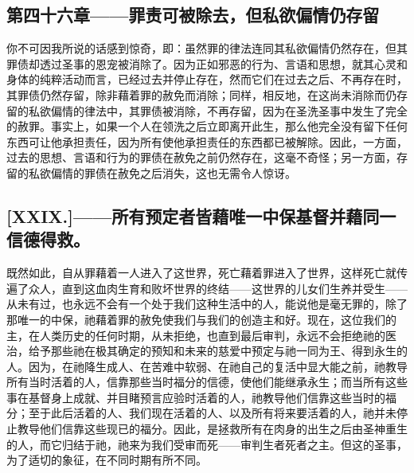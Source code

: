 
\subsection{第四十六章——罪责可被除去，但私欲偏情仍存留}

你不可因我所说的话感到惊奇，即：虽然罪的律法连同其私欲偏情仍然存在，但其罪债却透过圣事的恩宠被消除了。因为正如邪恶的行为、言语和思想，就其心灵和身体的纯粹活动而言，已经过去并停止存在，然而它们在过去之后、不再存在时，其罪债仍然存留，除非藉着罪的赦免而消除；同样，相反地，在这尚未消除而仍存留的私欲偏情的律法中，其罪债被消除，不再存留，因为在圣洗圣事中发生了完全的赦罪。事实上，如果一个人在领洗之后立即离开此生，那么他完全没有留下任何东西可让他承担责任，因为所有使他承担责任的东西都已被解除。因此，一方面，过去的思想、言语和行为的罪债在赦免之前仍然存在，这毫不奇怪；另一方面，存留的私欲偏情的罪债在赦免之后消失，这也无需令人惊讶。\par


\subsection{[XXIX.]——所有预定者皆藉唯一中保基督并藉同一信德得救。}

既然如此，自从罪藉着一人进入了这世界，死亡藉着罪进入了世界，这样死亡就传遍了众人，直到这血肉生育和败坏世界的终结——这世界的儿女们生养并受生——从未有过，也永远不会有一个处于我们这种生活中的人，能说他是毫无罪的，除了那唯一的中保，祂藉着罪的赦免使我们与我们的创造主和好。现在，这位我们的主，在人类历史的任何时期，从未拒绝，也直到最后审判，永远不会拒绝祂的医治，给予那些祂在极其确定的预知和未来的慈爱中预定与祂一同为王、得到永生的人。因为，在祂降生成人、在苦难中软弱、在祂自己的复活中显大能之前，祂教导所有当时活着的人，信靠那些当时福分的信德，使他们能继承永生；而当所有这些事在基督身上成就、并目睹预言应验时活着的人，祂教导他们信靠这些当时的福分；至于此后活着的人、我们现在活着的人、以及所有将来要活着的人，祂并未停止教导他们信靠这些现已的福分。因此，是拯救所有在肉身的出生之后由圣神重生的人，而它归结于祂，祂来为我们受审而死——审判生者死者之主。但这的圣事，为了适切的象征，在不同时期有所不同。\par


